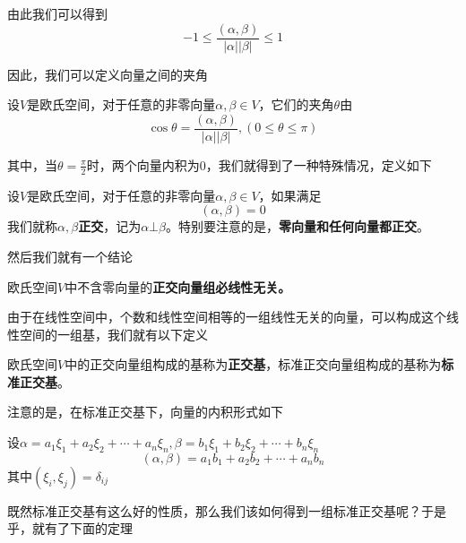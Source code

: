 \documentclass[lang=cn,10pt]{elegantbook}
\begin{document}
	 由此我们可以得到
	 \begin{equation*}
	 	-1\le\frac{(\alpha,\beta)}{|\alpha||\beta|}\le 1
	 \end{equation*}
	
	因此，我们可以定义向量之间的夹角
	\begin{definition}
		设$V$是欧氏空间，对于任意的非零向量$\alpha, \beta \in V$，它们的夹角$\theta $由
		\begin{equation*}
			\cos \theta=\frac{(\alpha,\beta)}{|\alpha||\beta|}, (0\le\theta\le \pi )
		\end{equation*}
	\end{definition}
	其中，当$ \theta=\frac{\pi}{2}$时，两个向量内积为0，我们就得到了一种特殊情况，定义如下
	\begin{definition}
		设$V$是欧氏空间，对于任意的非零向量$\alpha, \beta \in V$，如果满足
		\begin{equation*}
			(\alpha, \beta)=0
		\end{equation*}
		我们就称$\alpha, \beta $\textbf{正交}，记为$\alpha\bot  \beta $。特别要注意的是，\textbf{零向量和任何向量都正交}。
	\end{definition}
	
	然后我们就有一个结论
	\begin{conclusion}
		欧氏空间$V$中不含零向量的\textbf{正交向量组必线性无关。}
	\end{conclusion}
	
	由于在线性空间中，个数和线性空间相等的一组线性无关的向量，可以构成这个线性空间的一组基，我们就有以下定义
	
	\begin{definition}
		欧氏空间$V$中的正交向量组构成的基称为\textbf{正交基}，标准正交向量组构成的基称为\textbf{标准正交基}。
	\end{definition}
	
	注意的是，在标准正交基下，向量的内积形式如下
	
	设$\alpha=a_{1}\xi _{1}+a_{2}\xi _{2}+\cdots+a_{n}\xi _{n},\beta=b_{1}\xi _{1}+b_{2}\xi _{2}+\cdots+b_{n}\xi _{n}$
	\begin{equation*}
		\left( \alpha,\beta \right) =a_1b_1+a_2b_2+\cdots +a_nb_n
	\end{equation*}
	其中$(\xi_{i},\xi_{j})=\delta_{ij}$
	
	既然标准正交基有这么好的性质，那么我们该如何得到一组标准正交基呢？于是乎，就有了下面的定理
	
\end{document}
